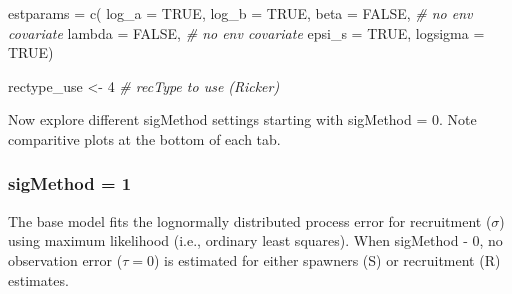 \documentclass[
]{article}
\newenvironment{Shaded}{\begin{snugshade}}{\end{snugshade}}
\newcommand{\AttributeTok}[1]{\textcolor[rgb]{0.77,0.63,0.00}{#1}}
\newcommand{\CommentTok}[1]{\textcolor[rgb]{0.56,0.35,0.01}{\textit{#1}}}
\newcommand{\ConstantTok}[1]{\textcolor[rgb]{0.00,0.00,0.00}{#1}}
\newcommand{\DecValTok}[1]{\textcolor[rgb]{0.00,0.00,0.81}{#1}}
\newcommand{\FunctionTok}[1]{\textcolor[rgb]{0.00,0.00,0.00}{#1}}
\newcommand{\NormalTok}[1]{#1}
\newcommand{\OtherTok}[1]{\textcolor[rgb]{0.56,0.35,0.01}{#1}}
\begin{document}
\begin{Shaded}
\begin{Highlighting}[]
\NormalTok{   estparams  }\OtherTok{=} \FunctionTok{c}\NormalTok{(}
    \AttributeTok{log\_a        =} \ConstantTok{TRUE}\NormalTok{,}
    \AttributeTok{log\_b        =} \ConstantTok{TRUE}\NormalTok{,}
    \AttributeTok{beta         =} \ConstantTok{FALSE}\NormalTok{,  }\CommentTok{\# no env covariate}
    \AttributeTok{lambda       =} \ConstantTok{FALSE}\NormalTok{,  }\CommentTok{\# no env covariate}
    \AttributeTok{epsi\_s       =} \ConstantTok{TRUE}\NormalTok{,}
    \AttributeTok{logsigma     =} \ConstantTok{TRUE}\NormalTok{)}

\NormalTok{   rectype\_use }\OtherTok{\textless{}{-}} \DecValTok{4} \CommentTok{\# recType to use (Ricker)}
\end{Highlighting}
\end{Shaded}

Now explore different sigMethod settings starting with sigMethod = 0.
Note comparitive plots at the bottom of each tab.

\hypertarget{sigmethod-1-1}{%
\subsubsection{sigMethod = 1}\label{sigmethod-1-1}}

The base model fits the lognormally distributed process error for
recruitment (\(\sigma\)) using maximum likelihood (i.e., ordinary least
squares). When sigMethod - 0, no observation error (\(\tau = 0\)) is
estimated for either spawners (S) or recruitment (R) estimates.
\end{document}
